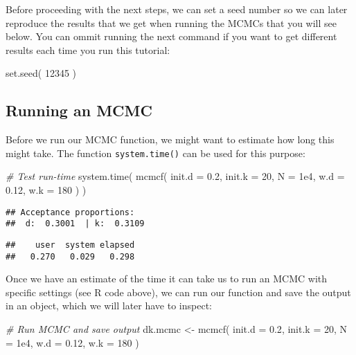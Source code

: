 \documentclass[
]{article}
\newenvironment{Shaded}{\begin{snugshade}}{\end{snugshade}}
\newcommand{\AttributeTok}[1]{\textcolor[rgb]{0.77,0.63,0.00}{#1}}
\newcommand{\CommentTok}[1]{\textcolor[rgb]{0.56,0.35,0.01}{\textit{#1}}}
\newcommand{\DecValTok}[1]{\textcolor[rgb]{0.00,0.00,0.81}{#1}}
\newcommand{\FloatTok}[1]{\textcolor[rgb]{0.00,0.00,0.81}{#1}}
\newcommand{\FunctionTok}[1]{\textcolor[rgb]{0.00,0.00,0.00}{#1}}
\newcommand{\NormalTok}[1]{#1}
\newcommand{\OtherTok}[1]{\textcolor[rgb]{0.56,0.35,0.01}{#1}}
\begin{document}
Before proceeding with the next steps, we can set a seed number so we
can later reproduce the results that we get when running the MCMCs that
you will see below. You can ommit running the next command if you want
to get different results each time you run this tutorial:

\begin{Shaded}
\begin{Highlighting}[]
\FunctionTok{set.seed}\NormalTok{( }\DecValTok{12345}\NormalTok{ )}
\end{Highlighting}
\end{Shaded}

\hypertarget{running-an-mcmc}{%
\subsection{Running an MCMC}\label{running-an-mcmc}}

Before we run our MCMC function, we might want to estimate how long this
might take. The function \texttt{system.time()} can be used for this
purpose:

\begin{Shaded}
\begin{Highlighting}[]
\CommentTok{\# Test run{-}time}
\FunctionTok{system.time}\NormalTok{( }\FunctionTok{mcmcf}\NormalTok{( }\AttributeTok{init.d =} \FloatTok{0.2}\NormalTok{, }\AttributeTok{init.k =} \DecValTok{20}\NormalTok{, }\AttributeTok{N =} \FloatTok{1e4}\NormalTok{,}
                    \AttributeTok{w.d =} \FloatTok{0.12}\NormalTok{, }\AttributeTok{w.k =} \DecValTok{180}\NormalTok{ ) )}
\end{Highlighting}
\end{Shaded}

\begin{verbatim}
## Acceptance proportions:
##  d:  0.3001  | k:  0.3109
\end{verbatim}

\begin{verbatim}
##    user  system elapsed 
##   0.270   0.029   0.298
\end{verbatim}

Once we have an estimate of the time it can take us to run an MCMC with
specific settings (see R code above), we can run our function and save
the output in an object, which we will later have to inspect:

\begin{Shaded}
\begin{Highlighting}[]
\CommentTok{\# Run MCMC and save output}
\NormalTok{dk.mcmc }\OtherTok{\textless{}{-}} \FunctionTok{mcmcf}\NormalTok{( }\AttributeTok{init.d =} \FloatTok{0.2}\NormalTok{, }\AttributeTok{init.k =} \DecValTok{20}\NormalTok{, }\AttributeTok{N =} \FloatTok{1e4}\NormalTok{,}
                  \AttributeTok{w.d =} \FloatTok{0.12}\NormalTok{, }\AttributeTok{w.k =} \DecValTok{180}\NormalTok{ )}
\end{Highlighting}
\end{Shaded}
\end{document}
